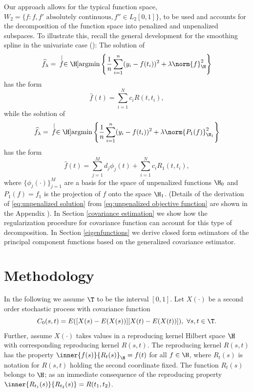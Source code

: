 Our approach allows for the typical function space, $W_2 = \{f : f, f' \mbox{ absolutely continuous}, f'' \in L_2[0,1]\}$, to be used and accounts for the decomposition of the function space into penalized and unpenalized subspaces. To illustrate this, recall the general development for the smoothing spline in the univariate case (\cite{Wahba:1990}): The solution of 
\begin{equation}
	\widehat{f}_{\lambda} = \hspace{.07in}\stackrel[f \in \H]{}{\mbox{argmin}} \left\{ \frac{1}{n}\sum_{i=1}^{n}(y_i - f(t_i))^2 + \lambda\norm{f}^2_{\H} \right\} 
\end{equation}
has the form 
\begin{equation}
	\hat{f}(t) = \sum_{i=1}^N c_iR(t, t_i), 
\end{equation}
while the solution of 
\begin{equation}
	\widehat{f}_{\lambda} = \hspace{.07in}\stackrel[f \in \H]{}{\mbox{argmin}} \left\{ \frac{1}{n}\sum_{i=1}^{n}(y_i - f(t_i))^2 + \lambda\norm{P_1(f)}^2_{\H_1} \right\} \label{eq:unpenalized objective function} 
\end{equation}
has the form 
\begin{equation}
	\hat{f}(t) = \sum_{j=1}^M d_j\phi_j(t) + \sum_{i=1}^N c_iR_1(t, t_i), \label{eq:unpenalized solution} 
\end{equation}
where $\{\phi_j(\cdot)\}_{j=1}^M$ are a basis for the space of unpenalized functions $\H_0$ and $P_1(f)=f_1$ is the projection of $f$ onto the space $\H_1$. (Details of the derivation of \eqref{eq:unpenalized solution} from \eqref{eq:unpenalized objective function} are shown in the Appendix ). In Section \ref{covariance estimation} we show how the regularization procedure for covariance function can account for this type of decomposition. In Section \ref{eigenfunctions} we derive closed form estimators of the principal component functions based on the generalized covariance estimator.

\section{Methodology} 

\label{sec:methodology}

In the following we assume $\T$ to be the interval $[0,1]$. Let $X(\cdot)$ be a second order stochastic process with covariance function
\[ C_{0}(s,t)=E([X(s)-E(X(s))][X(t)-E(X(t))]),\mbox{ }\forall s,t\in \T. \]
Further, assume $X(\cdot)$ takes values in a reproducing kernel Hilbert space $\H$ with corresponding reproducing kernel $R(s,t)$. The reproducing kernel $R(s,t)$ has the property $\inner{f(s)}{R_t(s)}_{\H} = f(t)$ for all $f \in \H$, where $R_t(s)$ is notation for $R(s,t)$ holding the second coordinate fixed. The function $R_t(s)$ belongs to $\H$; as an immediate consequence of the reproducing property $\inner{R_{t_1}(s)}{R_{t_2}(s)} = R(t_1, t_2)$. 

